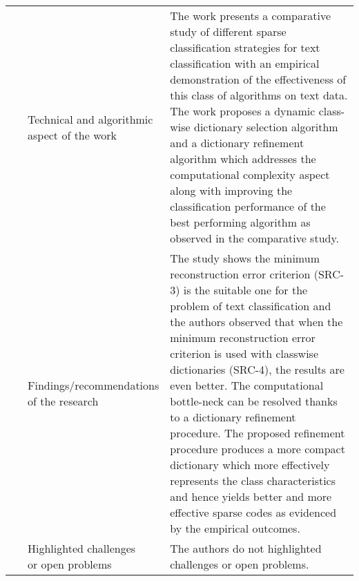 \begin{landscape}
\begin{longtable}{lp{}p{}}
	\multirow{3}[0]{*}{~\citep{Unnikrishnan2019}} & 
    \specialcell{Technical and algorithmic \\ aspect of the work} &
	The work presents a comparative study of different sparse classification strategies for text classification with an empirical demonstration of the effectiveness of this class of algorithms on text data. The work proposes a dynamic class-wise dictionary selection algorithm and a dictionary refinement algorithm which addresses the computational complexity aspect along with improving the classification performance of the best performing algorithm as observed in the comparative study.    
    \\ & 
    \specialcell{Findings/recommendations \\ of the research} & 
	The study shows the minimum reconstruction error criterion (SRC-3) is the suitable one for the problem of text classification and the authors observed that when the minimum reconstruction error criterion is used with classwise dictionaries (SRC-4), the results are even better. The computational bottle-neck can be resolved thanks to a dictionary refinement procedure. The proposed refinement procedure produces a more compact dictionary which more effectively represents the class characteristics and hence yields better and more effective sparse codes as evidenced by the empirical outcomes.
    \\ & 
    \specialcell{Highlighted challenges \\ or open problems} & 
    The authors do not highlighted challenges or open problems.
	\\
		

\end{longtable}
\end{landscape}
